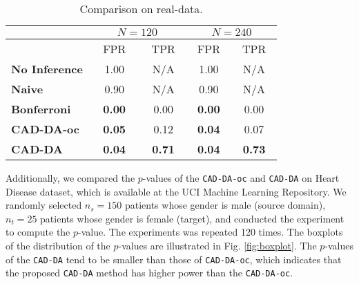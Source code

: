 \begin{table} [!t]
\renewcommand{\arraystretch}{1.1}
\centering
\caption{Comparison on real-data.}
\begin{tabular}{ |l|c|c|c|c| } 
  \hline
  & \multicolumn{2}{|c|}{$N = 120$} & \multicolumn{2}{|c|}{$N = 240$} \\ 
  \hline
  & ~ FPR ~&~TPR~&~FPR~&~TPR~\\
  \hline
   \hline
 \textbf{No Inference} & 1.00 & N/A & 1.00 & N/A \\ 
  \hline
 \textbf{Naive} & 0.90 & N/A & 0.90 & N/A \\ 
 \hline
 \textbf{Bonferroni} & \textbf{0.00} & 0.00 & \textbf{0.00} &  0.00 \\ 
  \hline
 \textbf{CAD-DA-oc} & \textbf{0.05} & 0.12 & \textbf{0.04} & 0.07 \\ 
  \hline
 \textbf{CAD-DA} & \textbf{0.04} & \textbf{0.71} & \textbf{0.04} & \textbf{0.73}\\ 
 \hline
\end{tabular}
\label{tbl:real_data_1}
\vspace{-10pt}
\end{table}



Additionally, we compared the $p$-values of the {\tt CAD-DA-oc} and {\tt CAD-DA} on Heart Disease dataset, which is available at the UCI Machine Learning Repository.
%
We randomly selected $n_s = 150$ patients whose gender is male (source domain), $n_t = 25$ patients whose gender is female (target), and conducted the experiment to compute the $p$-value.
%
The experiments was repeated 120 times. The boxplots of the distribution of the $p$-values are illustrated in Fig. \ref{fig:boxplot}.
%
The $p$-values of the {\tt CAD-DA} tend to be smaller than those of {\tt CAD-DA-oc}, which indicates that the proposed {\tt CAD-DA} method has higher power than the {\tt CAD-DA-oc}.







